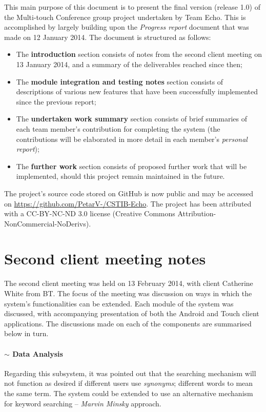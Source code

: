 \documentclass[12p, a4paper, onecolumn]{report}
\begin{document}
This main purpose of this document is to present the final version (release 1.0) of the Multi-touch Conference group project undertaken by Team Echo. This is accomplished by largely building upon the \emph{Progress report} document that was made on 12 January 2014. The document is structured as follows:
\begin{itemize}
	\item The \textbf{introduction} section consists of notes from the second client meeting on 13 January 2014, and a summary of the deliverables reached since then;
	\item The \textbf{module integration and testing notes} section consists of descriptions of various new features that have been successfully implemented since the previous report;
	\item The \textbf{undertaken work summary} section consists of brief summaries of each team member's contribution for completing the system (the contributions will be elaborated in more detail in each member's \emph{personal report});
	\item The \textbf{further work} section consists of proposed further work that will be implemented, should this project remain maintained in the future.
\end{itemize}
The project's source code stored on GitHub is now public and may be accessed on \url{https://github.com/PetarV-/CSTIB-Echo}. The project has been attributed with a CC-BY-NC-ND 3.0 license (Creative Commons Attribution-NonCommercial-NoDerivs).

\section{Second client meeting notes}

The second client meeting was held on 13 February 2014, with client Catherine White from BT. The focus of the meeting was discussion on ways in which the system's functionalities can be extended. Each module of the system was discussed, with accompanying presentation of both the Android and Touch client applications. The discussions made on each of the components are summarised below in turn.

\paragraph{$\sim$ Data Analysis}
Regarding this subsystem, it was pointed out that the searching mechanism will not function as desired if different users use \emph{synonyms}; different words to mean the same term. The system could be extended to use an alternative mechanism for keyword searching -- \emph{Marvin Minsky} approach.
\end{document}
